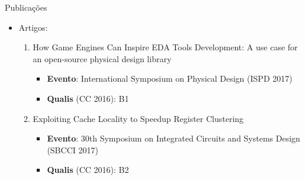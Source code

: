 \begin{frame}{Publicações}

    \begin{itemize}
        \item Artigos:
        \begin{enumerate}
            \itemsep15pt 
            \item How Game Engines Can Inspire EDA Tools Development: A use case for an open-source physical design library
            \begin{itemize}
                \item \textbf{Evento}: International Symposium on Physical Design (ISPD 2017)
                \item \textbf{Qualis} (CC 2016): B1
            \end{itemize}
            \item Exploiting Cache Locality to Speedup Register Clustering
            \begin{itemize}
                \item \textbf{Evento}: 30th Symposium on Integrated Circuits and Systems Design (SBCCI 2017)
                \item \textbf{Qualis} (CC 2016): B2
            \end{itemize}
        \end{enumerate}
    \end{itemize}
    
\end{frame}


